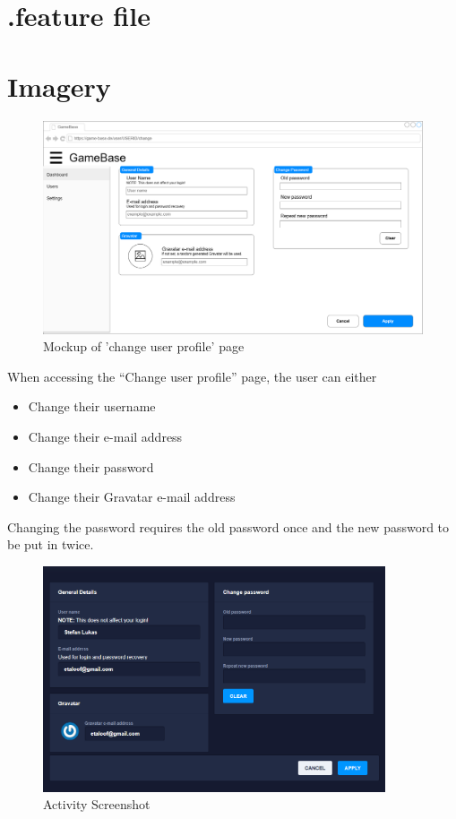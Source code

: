 \documentclass[a4paper,12pt,chapterprefix=false,bibliography=totoc,listof=totoc,book]{scrreprt}
\begin{document}
    \section{.feature file}
    \begin{minipage}{\textwidth}
    
    \end{minipage}

    \section{Imagery}
    \begin{figure}[H]
        \includegraphics[width=\textwidth]{diagramms/UCChangeUserProfileMockup.png}
        \caption{Mockup of 'change user profile' page}
        \label{fig:mockup}
    \end{figure}
    When accessing the \enquote{Change user profile} page, the user can either
    \begin{itemize}
        \item Change their username
        \item Change their e-mail address
        \item Change their password
        \item Change their Gravatar e-mail address
    \end{itemize}
    Changing the password requires the old password once and the new password to be put in twice.
    \begin{figure}[H]
        \includegraphics[width=0.9\textwidth]{diagramms/UCChangeUserProfileScreenshot.png}
        \caption{Activity Screenshot}
        \label{fig:screen}
    \end{figure}
\end{document}
